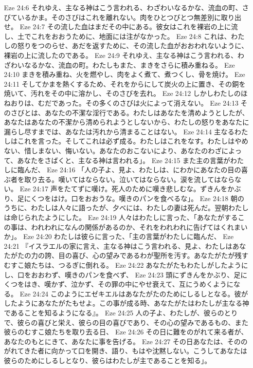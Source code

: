 Eze 24:6  それゆえ、主なる神はこう言われる、わざわいなるかな、流血の町、さびているかま。そのさびはこれを離れない。肉をひとつびとつ無差別に取り出せ。
Eze 24:7  その流した血はまだその中にある。彼女はこれを裸岩の上に流し、土でこれをおおうために、地面には注がなかった。
Eze 24:8  これは、わたしの怒りをつのらせ、あだを返すために、その流した血がおおわれないように、裸岩の上に流したのである。
Eze 24:9  それゆえ、主なる神はこう言われる、わざわいなるかな、流血の町。わたしもまた、まきをさらに積み重ねる。
Eze 24:10  まきを積み重ね、火を燃やし、肉をよく煮て、煮つくし、骨を焼け。
Eze 24:11  そしてかまを熱くするため、それをからにして炭火の上に置き、その銅を焼いて、汚れをその中に溶かし、そのさびを去れ。
Eze 24:12  しかしわたしのほねおりは、むだであった。その多くのさびは火によって消えない。
Eze 24:13  そのさびとは、あなたの不潔な淫行である。わたしはあなたを清めようとしたが、あなたはあなたの不潔から清められようとしないから、わたしの怒りをあなたに漏らし尽すまでは、あなたは汚れから清まることはない。
Eze 24:14  主なるわたしはこれを言った。そしてこれは必ず成る。わたしはこれをなす。わたしはやめない、惜しまない、悔いない。あなたのおこないにより、あなたのわざによって、あなたをさばくと、主なる神は言われる」。
Eze 24:15  また主の言葉がわたしに臨んだ、
Eze 24:16  「人の子よ、見よ、わたしは、にわかにあなたの目の喜ぶ者を取り去る。嘆いてはならない。泣いてはならない。涙を流してはならない。
Eze 24:17  声をたてずに嘆け。死人のために嘆き悲しむな。ずきんをかぶり、足にくつをはけ。口をおおうな。嘆きのパンを食べるな」。
Eze 24:18  朝のうちに、わたしは人々に語ったが、夕べには、わたしの妻は死んだ。翌朝わたしは命じられたようにした。
Eze 24:19  人々はわたしに言った、「あなたがするこの事は、われわれになんの関係があるのか、それをわれわれに告げてはくれまいか」。
Eze 24:20  わたしは彼らに言った、「主の言葉がわたしに臨んだ、
Eze 24:21  『イスラエルの家に言え、主なる神はこう言われる、見よ、わたしはあなたがたの力の誇、目の喜び、心の望みであるわが聖所を汚す。あなたがたが残すむすこ娘たちは、つるぎに倒れる。
Eze 24:22  あなたがたもわたしがしたようにし、口をおおわず、嘆きのパンを食べず、
Eze 24:23  頭にずきんをかぶり、足にくつをはき、嘆かず、泣かず、その罪の中にやせ衰えて、互にうめくようになる。
Eze 24:24  このようにエゼキエルはあなたがたのためにしるしとなる。彼がしたようにあなたがたもせよ。この事が成る時、あなたがたはわたしが主なる神であることを知るようになる』。
Eze 24:25  人の子よ、わたしが、彼らのとりで、彼らの喜びと栄え、彼らの目の喜びであり、その心の望みであるもの、また彼らのむすこ娘たちを取り去る日、
Eze 24:26  その日に難をのがれて来る者が、あなたのもとにきて、あなたに事を告げる。
Eze 24:27  その日あなたは、そののがれてきた者に向かって口を開き、語り、もはや沈黙しない。こうしてあなたは彼らのためにしるしとなり、彼らはわたしが主であることを知る」。
